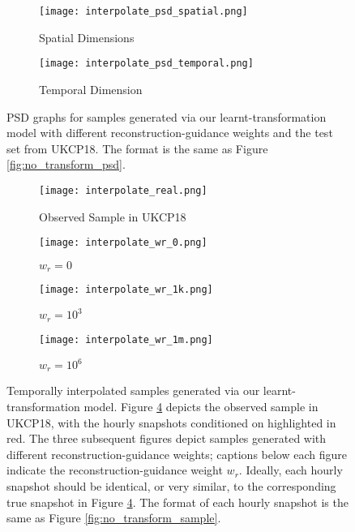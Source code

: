 \documentclass[ oneside,%
                    author={George Herbert},
                    degree={MSci},
                     title={Video Diffusion Models for Climate Simulations},
                  subtitle={}]{dissertation}
\begin{document}
\begin{figure}[htbp]
      \centering
      \begin{subfigure}{.49\textwidth}
            \texttt{[image: interpolate\_psd\_spatial.png]}
            \caption{Spatial Dimensions}
            \label{fig:interpolate_psd_spatial}
      \end{subfigure}
      \begin{subfigure}{.49\textwidth}
            \texttt{[image: interpolate\_psd\_temporal.png]}
            \caption{Temporal Dimension}
            \label{fig:interpolate_psd_temporal}
      \end{subfigure}
      \caption{PSD graphs for samples generated via our learnt-transformation model with different reconstruction-guidance weights and the test set from UKCP18. The format is the same as Figure \ref{fig:no_transform_psd}.}
      \label{fig:interpolate_psd}
\end{figure}

\begin{figure}[htbp]
      \centering
      \begin{subfigure}{\textwidth}
            \texttt{[image: interpolate\_real.png]}
            \caption{Observed Sample in UKCP18}
            \label{fig:interpolate_sample_real}
      \end{subfigure}
      \begin{subfigure}{\textwidth}
            \texttt{[image: interpolate\_wr\_0.png]}
            \caption{$w_r=0$}
            \label{fig:interpolate_sample_wr_0}
      \end{subfigure}
      \begin{subfigure}{\textwidth}
            \texttt{[image: interpolate\_wr\_1k.png]}
            \caption{$w_r=10^3$}
            \label{fig:interpolate_sample_wr_1k}
      \end{subfigure}
      \begin{subfigure}{\textwidth}
            \texttt{[image: interpolate\_wr\_1m.png]}
            \caption{$w_r=10^6$}
            \label{fig:interpolate_sample_wr_1m}
      \end{subfigure}
      \caption{Temporally interpolated samples generated via our learnt-transformation model. Figure \ref{fig:interpolate_sample_real} depicts the observed sample in UKCP18, with the hourly snapshots conditioned on highlighted in red. The three subsequent figures depict samples generated with different reconstruction-guidance weights; captions below each figure indicate the reconstruction-guidance weight $w_r$. Ideally, each hourly snapshot should be identical, or very similar, to the corresponding true snapshot in Figure \ref{fig:interpolate_sample_real}. The format of each hourly snapshot is the same as Figure \ref{fig:no_transform_sample}.}
      \label{fig:interpolate_sample}
\end{figure}
\end{document}
